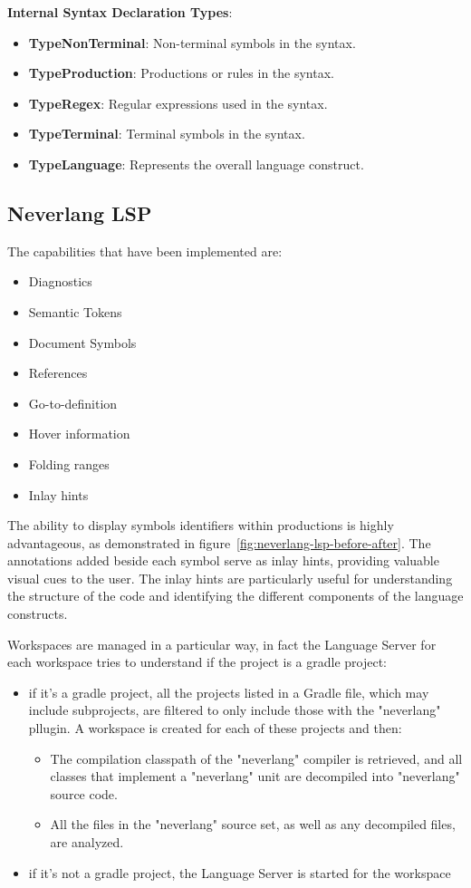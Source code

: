 \hfill \break
\noindent
\textbf{Internal Syntax Declaration Types}:
\begin{itemize}
\item \textbf{TypeNonTerminal}: Non-terminal symbols in the syntax.
\item \textbf{TypeProduction}: Productions or rules in the syntax.
\item \textbf{TypeRegex}: Regular expressions used in the syntax.
\item \textbf{TypeTerminal}: Terminal symbols in the syntax.
\item \textbf{TypeLanguage}: Represents the overall language construct.
\end{itemize}

\subsection{Neverlang LSP}\label{subsec:neverlang-lsp}

The capabilities that have been implemented are:
\begin{itemize}
    \item Diagnostics
    \item Semantic Tokens
    \item Document Symbols
    \item References
    \item Go-to-definition
    \item Hover information
    \item Folding ranges
    \item Inlay hints
\end{itemize}

The ability to display symbols identifiers within productions is highly advantageous, as demonstrated in figure~\ref{fig:neverlang-lsp-before-after}. The annotations added beside each symbol serve as inlay hints, providing valuable visual cues to the user. The inlay hints are particularly useful for understanding the structure of the code and identifying the different components of the language constructs.

Workspaces are managed in a particular way, in fact the Language Server for each workspace tries to understand if the project is a gradle project:
\begin{itemize}
    \item if it’s a gradle project, all the projects listed in a Gradle file, which may include subprojects, are filtered to only include those with the "neverlang" pllugin. A workspace is created for each of these projects and then:
    \begin{itemize}
        \item The compilation classpath of the "neverlang" compiler is retrieved, and all classes that implement a "neverlang" unit are decompiled into "neverlang" source code.
        \item All the files in the "neverlang" source set, as well as any decompiled files, are analyzed.
    \end{itemize}
    \item if it’s not a gradle project, the Language Server is started for the workspace
\end{itemize}

